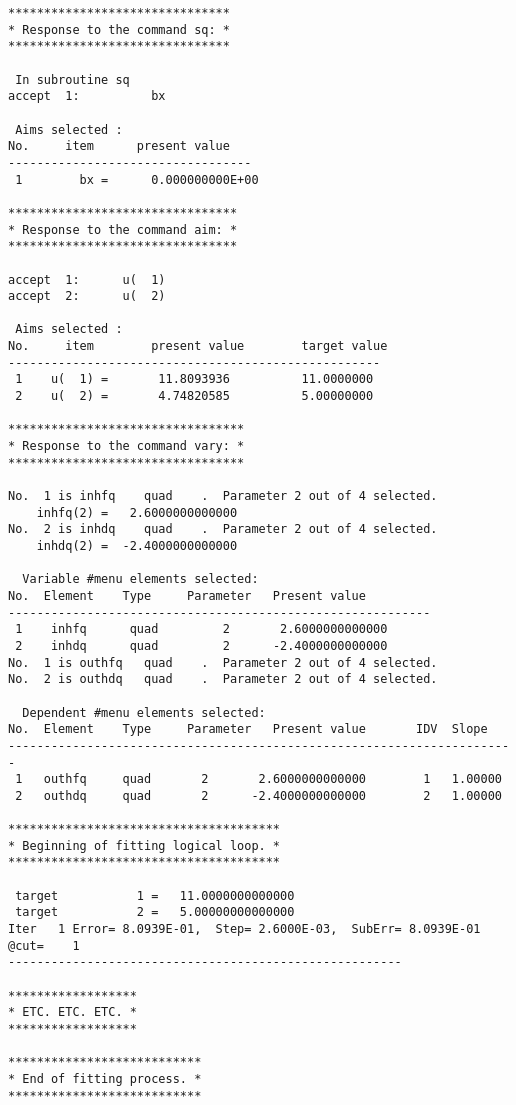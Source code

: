 \begin{footnotesize}
\begin{verbatim}
*******************************
* Response to the command sq: *
*******************************

 In subroutine sq
accept  1:          bx

 Aims selected :
No.     item      present value
----------------------------------
 1        bx =      0.000000000E+00

********************************
* Response to the command aim: *
********************************

accept  1:      u(  1)
accept  2:      u(  2)

 Aims selected :
No.     item        present value        target value
----------------------------------------------------
 1    u(  1) =       11.8093936          11.0000000
 2    u(  2) =       4.74820585          5.00000000

*********************************
* Response to the command vary: *
*********************************

No.  1 is inhfq    quad    .  Parameter 2 out of 4 selected.
    inhfq(2) =   2.6000000000000
No.  2 is inhdq    quad    .  Parameter 2 out of 4 selected.
    inhdq(2) =  -2.4000000000000

  Variable #menu elements selected:
No.  Element    Type     Parameter   Present value
-----------------------------------------------------------
 1    inhfq      quad         2       2.6000000000000
 2    inhdq      quad         2      -2.4000000000000
No.  1 is outhfq   quad    .  Parameter 2 out of 4 selected.
No.  2 is outhdq   quad    .  Parameter 2 out of 4 selected.

  Dependent #menu elements selected:
No.  Element    Type     Parameter   Present value       IDV  Slope
-----------------------------------------------------------------------
 1   outhfq     quad       2       2.6000000000000        1   1.00000
 2   outhdq     quad       2      -2.4000000000000        2   1.00000

**************************************
* Beginning of fitting logical loop. *
**************************************

 target           1 =   11.0000000000000
 target           2 =   5.00000000000000
Iter   1 Error= 8.0939E-01,  Step= 2.6000E-03,  SubErr= 8.0939E-01 @cut=    1
-------------------------------------------------------

******************
* ETC. ETC. ETC. *
******************

***************************
* End of fitting process. *
***************************


\end{verbatim}
\end{footnotesize}
